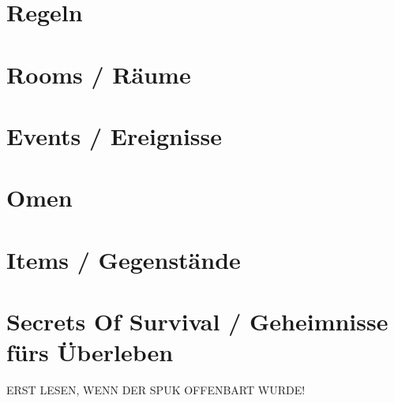 \documentclass[11pt,a4paper,oneside,ngerman]{article}
\begin{document}


\tableofcontents



\pagebreak

\section{Regeln}
\setlength\parskip{7pt}
\begin{flushleft}

\end{flushleft}
\setlength\parskip{0pt}

\pagebreak

\section{Rooms / Räume}



\twocolumn

\section{Events / Ereignisse}


\pagebreak

\section{Omen}


\pagebreak

\section{Items / Gegenstände}


\onecolumn



\onecolumn
\section{Secrets Of Survival / Geheimnisse fürs Überleben }
\label{kap:sos}
ERST LESEN, WENN DER SPUK OFFENBART WURDE!
\twocolumn
\end{document}
